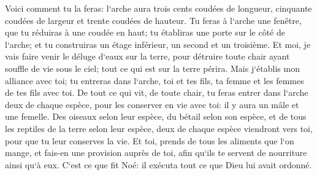 \verse Voici comment tu la feras: l`arche aura trois cents coudées de longueur, cinquante coudées de largeur et trente coudées de hauteur. 
\verse Tu feras à l`arche une fenêtre, que tu réduiras à une coudée en haut; tu établiras une porte sur le côté de l`arche; et tu construiras un étage inférieur, un second et un troisième. 
\verse Et moi, je vais faire venir le déluge d`eaux sur la terre, pour détruire toute chair ayant souffle de vie sous le ciel; tout ce qui est sur la terre périra. 
\verse Mais j`établis mon alliance avec toi; tu entreras dans l`arche, toi et tes fils, ta femme et les femmes de tes fils avec toi. 
\verse De tout ce qui vit, de toute chair, tu feras entrer dans l`arche deux de chaque espèce, pour les conserver en vie avec toi: il y aura un mâle et une femelle. 
\verse Des oiseaux selon leur espèce, du bétail selon son espèce, et de tous les reptiles de la terre selon leur espèce, deux de chaque espèce viendront vers toi, pour que tu leur conserves la vie. 
\verse Et toi, prends de tous les aliments que l`on mange, et fais-en une provision auprès de toi, afin qu`ils te servent de nourriture ainsi qu`à eux. 
\verse C`est ce que fit Noé: il exécuta tout ce que Dieu lui avait ordonné. 

